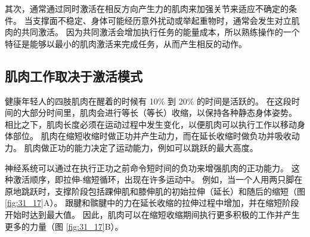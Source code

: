 其次，通常通过同时激活在相反方向产生力的肌肉来加强关节来适应不确定的条件。
当支撑面不稳定、身体可能经历意外扰动或举起重物时，通常会发生对立肌肉的共同激活。
因为共同激活会增加执行任务的能量成本，所以熟练操作的一个特征是能够以最小的肌肉激活来完成任务，从而产生相反的动作。


\subsection{肌肉工作取决于激活模式}

健康年轻人的四肢肌肉在醒着的时候有 10\% 到 20\% 的时间是活跃的。
在这段时间的大部分时间里，肌肉会进行等长（等长）收缩，以保持各种静态身体姿势。
相比之下，肌肉长度必须在运动过程中发生变化，以便肌肉可以执行工作以移动身体部位。
肌肉在缩短收缩时做正功并产生动力，而在延长收缩时做负功并吸收动力。
肌肉做正功的能力决定了运动能力，例如可以跳跃的最大高度。


神经系统可以通过在执行正功之前命令短时间的负功来增强肌肉的正功能力。
这种激活顺序，即拉伸-缩短循环，出现在许多运动中。 
例如，当一个人用两只脚在原地跳跃时，支撑阶段包括踝伸肌和膝伸肌的初始拉伸（延长）和随后的缩短（图 \ref{fig:31_17}A）。
跟腱和髌腱中的力在延长收缩的拉伸过程中增加，并在缩短阶段开始时达到最大值。
因此，肌肉可以在缩短收缩期间执行更多积极的工作并产生更多的力量（图 \ref{fig:31_17}B）。


